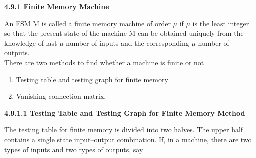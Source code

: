 \documentclass[9pt]{beamer}
\begin{document}
\begin{frame}
\large{
\textbf{4.9.1 Finite Memory Machine}\\
}

\vspace*{0.2cm}
\small{
An FSM M is called a finite memory machine of order $\mu$ if $\mu$ is the least integer so that the present state
of the machine M can be obtained uniquely from the knowledge of last $\mu$ number of inputs and the
corresponding $\mu$ number of outputs.\\
\hspace*{0.5cm} There are two methods to find whether a machine is finite or not\\
}

\vspace*{0.1cm}
\begin{enumerate}
  \item Testing table and testing graph for finite memory\\
  \item Vanishing connection matrix.\\
\end{enumerate}

\vspace*{0.4cm}
\large{
\textbf{4.9.1.1 Testing Table and Testing Graph for Finite Memory Method}\\
}

\vspace*{0.2cm}
\small{
The testing table for finite memory is divided into two halves. The upper half contains a single state
input–output combination. If, in a machine, there are two types of inputs and two types of outputs, say
}
\end{frame}
\end{document}
